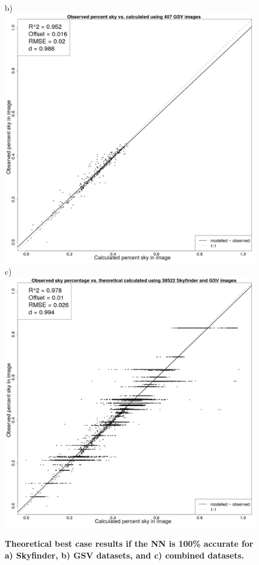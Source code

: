 \documentclass[final,3p,times,authoryear]{elsarticle}
\begin{document}
\begin{figure}
b)\includegraphics[scale=0.15]{Images/ErrorPlots2.png}
c)\includegraphics[scale=0.15]{Images/ErrorPlots1Combined.png}
\caption{\textbf{Theoretical best case results if the NN is 100\% accurate for a) Skyfinder, b) GSV datasets, and c) combined datasets.}}
\label{fig:errorplots}
\end{figure}
\end{document}
